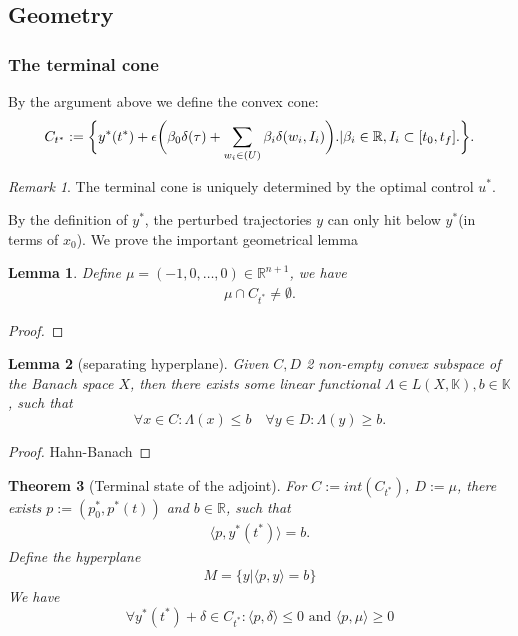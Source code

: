 \documentclass[a4paper,11pt,fleqn]{book}
\newtheorem{theorem}{Theorem}[section]
\newtheorem{lemma}[theorem]{Lemma}
\theoremstyle{definition}
\theoremstyle{remark}
\newtheorem*{remark}{Remark}
\let\ran\relax
\DeclareMathOperator{\ran}{ran}
\begin{document}
\subsection{Geometry}                         
\subsubsection{The terminal cone}
By the argument above we define the convex cone:
\begin{equation}
	C_{t^*}:= \bigg\{y^*(t^*) + \epsilon\bigg( \beta_0 \delta(\tau)+ \sum_{w_i \in \ran (U)} \beta_i \delta(w_i, I_i) \bigg). | \beta_i \in \mathbb{R}, I_i \subset [t_0, t_f]. \bigg\}.
\end{equation}
\begin{remark}
The terminal cone is uniquely determined by the optimal control $u^*$. 	
\end{remark}


By the definition of $y^*$, the perturbed trajectories $y$ can only hit below $y^*$(in terms of $x_0$). We prove the important geometrical lemma
\begin{lemma}
	Define $\mu = (-1, 0, \dots, 0) \in \mathbb{R}^{n + 1}$, we have
	\begin{align*}
		\mu \cap C_{t^*} \neq \emptyset. 
	\end{align*}
\end{lemma}
\begin{proof}
\end{proof}




\begin{lemma}[separating hyperplane]
	Given $C, D$ 2 non-empty convex subspace of the Banach space $X$, then there exists some linear functional $\Lambda \in L(X, \mathbb{K}), b \in \mathbb{K}$, such that 
	\begin{equation}
		\forall x \in C: \Lambda(x) \le b \quad \forall y \in D: \Lambda(y) \ge b. 
	\end{equation}
\end{lemma}
\begin{proof}
Hahn-Banach
\end{proof}

\begin{theorem}[Terminal state of the adjoint]
	For $C:= int(C_{t^*})$, $D:= \mu$, there exists $p := (p^*_0, p^*(t))$ and $b \in \mathbb{R}$, such that 
	\begin{align*}
		\langle p, y^*(t^*) \rangle = b.
	\end{align*}
	Define the hyperplane
	\begin{align*}
		M = \{y | \langle p, y \rangle = b \}
	\end{align*}
	We have
	\begin{equation}
		\forall y^*(t^*) + \delta \in C_{t^*}: \langle p, \delta \rangle \le 0  \text{ and } \langle p, \mu \rangle \ge 0
	\end{equation}
\end{theorem}
\end{document}
